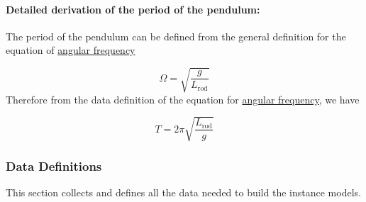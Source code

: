 \documentclass[12pt]{article}
\begin{document}
\paragraph{Detailed derivation of the period of the pendulum:}
\label{GD:periodPendDeriv}
The period of the pendulum can be defined from the general definition for the equation of \hyperref[GD:angFrequencyGD]{angular frequency}

\begin{displaymath}
Ω=\sqrt{\frac{g}{{L_{\text{rod}}}}}
\end{displaymath}
Therefore from the data definition of the equation for \hyperref[DD:angFrequencyDD]{angular frequency}, we have

\begin{displaymath}
T=2 π \sqrt{\frac{{L_{\text{rod}}}}{g}}
\end{displaymath}
\subsubsection{Data Definitions}
\label{Sec:DDs}
This section collects and defines all the data needed to build the instance models.
\end{document}
